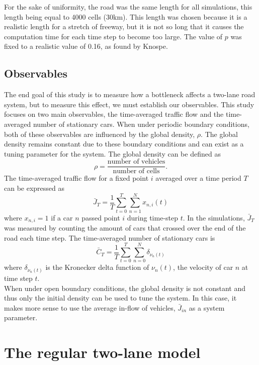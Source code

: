 \documentclass[11pt]{article}
\begin{document}
	For the sake of uniformity, the road was the same length for all simulations, this length being equal to 4000 cells (30km). This length was chosen because it is a realistic length for a stretch of freeway, but it is not so long that it causes the computation time for each time step to become too large. The value of $p$ was fixed to a realistic value of 0.16, as found by Knospe\cite{duepublico_mods_00005368}. \\
	
	\subsection{Observables}\label{subsec:obs}
	
	The end goal of this study is to measure how a bottleneck affects a two-lane road system, but to measure this effect, we must establish our observables. This study focuses on two main observables, the time-averaged traffic flow and the time-averaged number of stationary cars. When under periodic boundary conditions, both of these observables are influenced by the global density, $\rho$. The global density remains constant due to these boundary conditions and can exist as a tuning parameter for the system. The global density can be defined as 
	\[ \rho = \frac{\text{number of vehicles}}{\text{number of cells}}. \]
	The time-averaged traffic flow for a fixed point $i$ averaged over a time period $T$ can be expressed as 
	\[ \bar{J}_T = \frac{1}{T} \sum^{T}_{t=0} \sum^{N}_{n=1} x_{n,i}(t) \]
	where $x_{n,i} = 1$ if a car $n$ passed point $i$ during time-step $t$. In the simulations, $\bar{J}_T$ was measured by counting the amount of cars that crossed over the end of the road each time step.
	The time-averaged number of stationary cars is 
	\[ \bar{C}_T = \frac{1}{T} \sum^{T}_{t=0} \sum^{N}_{n=0} \delta_{\nu_n(t)} \]
	where $\delta_{\nu_n(t)}$ is the Kronecker delta function of $\nu_{n}(t)$, the velocity of car $n$ at time step $t$. \\
	When under open boundary conditions, the global density is not constant and thus only the initial density can be used to tune the system. In this case, it makes more sense to use the average in-flow of vehicles, $\bar{J}_{in}$ as a system parameter.\\
	
	\section{The regular two-lane model} \label{sec:regularNaSch}
	
\end{document}
